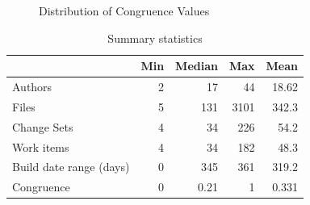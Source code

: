 \begin{figure}[t]
  \centering
	\caption{Distribution of Congruence Values}
	\label{fig:hist_unweighted_congruence}
\end{figure}

\begin{table}[t]
\centering
\begin{tabular}{lrrrr}
\toprule
 & Min & Median & Max & Mean\\\midrule
Authors & 2 & 17 & 44 & 18.62\\
Files & 5 & 131 & 3101 & 342.3 \\
Change Sets & 4  & 34  & 226 & 54.2\\
Work items & 4 & 34  & 182 & 48.3 \\
Build date range (days) & 0  & 345  & 361 & 319.2 \\
Congruence & 0  & 0.21  & 1 & 0.331 \\
\bottomrule
\end{tabular}
\caption{Summary statistics}
\label{tab:summary}
\end{table}

